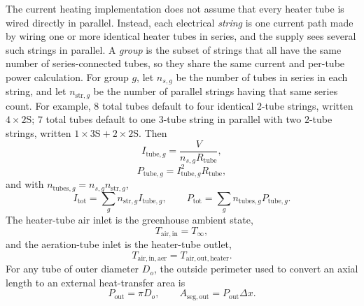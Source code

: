 \documentclass[11pt]{article}
\begin{document}
The current heating implementation does not assume that every heater tube is wired directly in parallel. Instead, each electrical \emph{string} is one current path made by wiring one or more identical heater tubes in series, and the supply sees several such strings in parallel. A \emph{group} is the subset of strings that all have the same number of series-connected tubes, so they share the same current and per-tube power calculation. For group \(g\), let \(n_{s,g}\) be the number of tubes in series in each string, and let \(n_{\mathrm{str},g}\) be the number of parallel strings having that same series count. For example, \(8\) total tubes default to four identical \(2\)-tube strings, written \(4\times 2\mathrm{S}\); \(7\) total tubes default to one \(3\)-tube string in parallel with two \(2\)-tube strings, written \(1\times 3\mathrm{S}+2\times 2\mathrm{S}\). Then
\begin{equation}
\label{eq:electrical_group_current}
I_{\mathrm{tube},g}=\frac{V}{n_{s,g}R_{\mathrm{tube}}},
\end{equation}
\begin{equation}
\label{eq:electrical_group_power}
P_{\mathrm{tube},g}=I_{\mathrm{tube},g}^2R_{\mathrm{tube}},
\end{equation}
and with \(n_{\mathrm{tubes},g}=n_{s,g}n_{\mathrm{str},g}\),
\begin{equation}
\label{eq:electrical_totals}
I_{\mathrm{tot}}=\sum_g n_{\mathrm{str},g}I_{\mathrm{tube},g},
\qquad
P_{\mathrm{tot}}=\sum_g n_{\mathrm{tubes},g}P_{\mathrm{tube},g}.
\end{equation}
The heater-tube air inlet is the greenhouse ambient state,
\begin{equation}
\label{eq:heater_air_inlet}
T_{\mathrm{air,in}}=T_{\infty},
\end{equation}
and the aeration-tube inlet is the heater-tube outlet,
\begin{equation}
\label{eq:aeration_air_inlet}
T_{\mathrm{air,in,aer}}=T_{\mathrm{air,out,heater}}.
\end{equation}
For any tube of outer diameter \(D_o\), the outside perimeter used to convert an axial length to an external heat-transfer area is
\begin{equation}
\label{eq:outer_perimeter}
P_{\mathrm{out}}=\pi D_o,
\qquad
A_{\mathrm{seg,out}}=P_{\mathrm{out}}\Delta x.
\end{equation}
\end{document}
